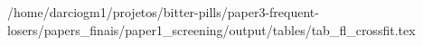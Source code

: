/home/darciogm1/projetos/bitter-pills/paper3-frequent-losers/papers_finais/paper1_screening/output/tables/tab_fl_crossfit.tex